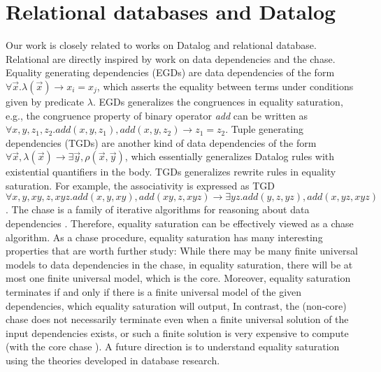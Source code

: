 \section{Relational databases and Datalog}

Our work is closely related to works on Datalog and relational database.
Relational \egraphs are directly inspired by work on data dependencies and the chase.
Equality generating dependencies (EGDs) are data dependencies of the form 
 $\forall \vec{x}.\lambda(\vec{x}) \rightarrow x_i=x_j$,
 which asserts the equality between terms under conditions given by predicate $\lambda$.
EGDs generalizes the congruences in equality saturation, 
 e.g., the congruence property of binary operator \textit{add} can be written as
 $\forall x,y,z_1,z_2.\textit{add}(x, y, z_1), \textit{add}(x, y, z_2)\rightarrow z_1=z_2$.
Tuple generating dependencies (TGDs) are another kind of data dependencies of the form
 $\forall \vec{x}, \lambda(\vec{x})\rightarrow \exists \vec{y}, \rho(\vec{x}, \vec{y})$,
 which essentially generalizes Datalog rules with existential quantifiers in the body.
TGDs generalizes rewrite rules in equality saturation.
For example, the associativity is expressed as TGD
 $\forall x,y,xy,z,xyz. \textit{add}(x, y, xy), \textit{add}(xy, z, xyz)\rightarrow \exists yz.\textit{add}(y, z, yz), \textit{add}(x, yz, xyz)$.
The chase is a family of iterative algorithms
 for reasoning about data dependencies \citep{chase-revisited, bench-chase}.
Therefore,
 equality saturation can be effectively viewed as a chase algorithm.
As a chase procedure, equality saturation has many interesting properties that are worth further study:
While there may be many finite universal models to data dependencies in the chase,
 in equality saturation,
 there will be at most one finite universal model, 
 which is the core.
Moreover,
 equality saturation terminates 
 if and only if there is a finite universal model of the given dependencies, 
 which equality saturation will output,
In contrast,
 the (non-core) chase does not necessarily terminate 
 even when a finite universal solution of the input dependencies exists,
 or such a finite solution is very expensive to compute (with the core chase \citep{chase-revisited}).
A future direction is 
 to understand equality saturation using the theories developed 
 in database research.

